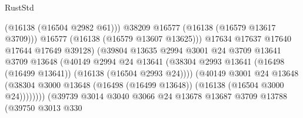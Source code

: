\begin{lexlean}{RustStd}
\begin{coremodule}
                                                (@16138 (@16504 @2982 @61)))
                                              @38209
                                              @16577
                                              (@16138 (@16579 @13617 @3709)))
                                            @16577
                                            (@16138 (@16579 @13607 @13625)))
                                          @17634
                                          @17637
                                          @17640
                                          @17644
                                          @17649
                                          @39128)
                                        (@39804
                                          @13635
                                          @2994
                                          @3001
                                          @24
                                          @3709
                                          @13641
                                          @3709
                                          @13648
                                          (@40149
                                            @2994
                                            @24
                                            @13641
                                            (@38304
                                              @2993
                                              @13641
                                              (@16498 (@16499 @13641))
                                              (@16138 (@16504 @2993 @24))))
                                          (@40149
                                            @3001
                                            @24
                                            @13648
                                            (@38304
                                              @3000
                                              @13648
                                              (@16498 (@16499 @13648))
                                              (@16138 (@16504 @3000 @24))))))))
                                  (@39739
                                    @3014
                                    @3040
                                    @3066
                                    @24
                                    @13678
                                    @13687
                                    @3709
                                    @13788
                                    (@39750
                                      @3013
                                      @330

\end{coremodule}
\end{lexlean}
